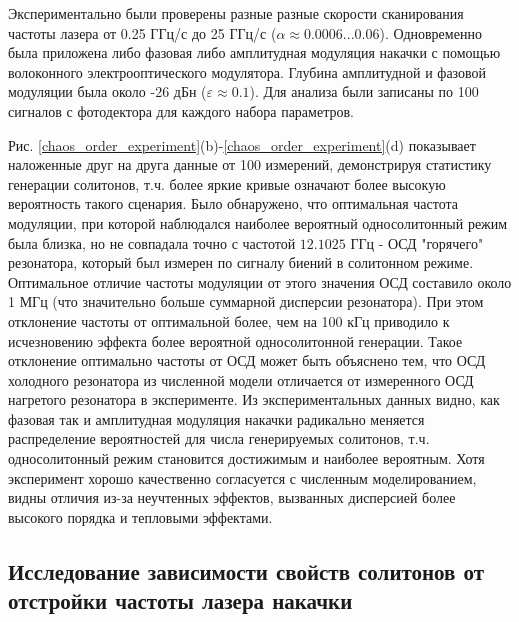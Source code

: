 Экспериментально были проверены разные разные скорости сканирования частоты лазера от 0.25 ГГц/с до 25 ГГц/с ($\alpha \approx 0.0006...0.06$). Одновременно была приложена либо фазовая либо амплитудная модуляция накачки с помощью волоконного электрооптического модулятора. Глубина амплитудной и фазовой модуляции была около -26 дБн ($\varepsilon \approx 0.1$). Для анализа были записаны по 100 сигналов с фотодектора для каждого набора параметров.

Рис. \ref{chaos_order_experiment}(b)-\ref{chaos_order_experiment}(d) показывает наложенные друг на друга данные от 100 измерений, демонстрируя статистику генерации солитонов, т.ч. более яркие кривые означают более высокую вероятность такого сценария. Было обнаружено, что оптимальная частота модуляции, при которой наблюдался наиболее вероятный односолитонный режим была близка, но не совпадала точно с частотой $12.1025$ ГГц - ОСД "горячего" резонатора, который был измерен по сигналу биений в солитонном режиме. Оптимальное отличие частоты модуляции от этого значения ОСД составило около 1 МГц (что значительно больше суммарной дисперсии резонатора). При этом отклонение частоты от оптимальной более, чем на 100 кГц приводило к исчезновению эффекта более вероятной односолитонной генерации. Такое отклонение оптимально частоты от ОСД может быть объяснено тем, что ОСД холодного резонатора из численной модели отличается от измеренного ОСД нагретого резонатора в эксперименте. Из экспериментальных данных видно, как фазовая так и амплитудная модуляция накачки радикально меняется распределение вероятностей для числа генерируемых солитонов, т.ч. односолитонный режим становится достижимым и наиболее вероятным. Хотя эксперимент хорошо качественно согласуется с численным моделированием, видны отличия из-за неучтенных эффектов, вызванных дисперсией более высокого порядка и тепловыми эффектами.

\subsection{Исследование зависимости свойств солитонов от отстройки частоты лазера накачки}

